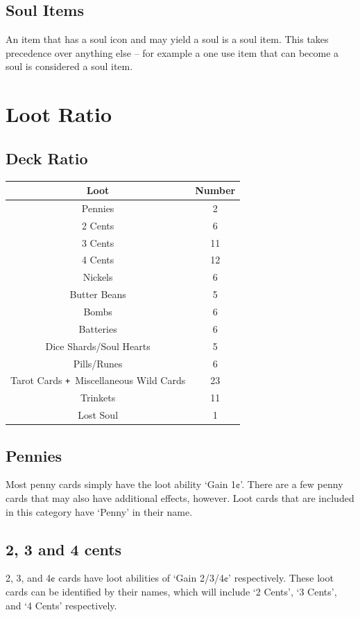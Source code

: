 \documentclass[a4paper, twoside]{report} %
\def\plus{\texttt{+}}
\begin{document}
    \subsection*{Soul Items}
    An item that has a soul icon and may yield a soul is a soul item. This takes precedence over anything else – for example a one use item that can become a soul is considered a soul item.

    \section{Loot Ratio}
    \subsection*{Deck Ratio}
    \begin{tabular}{ | c | c | }
        \hline
        \textbf{Loot} & \textbf{Number}\\
        \hline 
        Pennies & 2\\
        2 Cents & 6\\
        3 Cents & 11\\
        4 Cents & 12\\
        Nickels & 6\\
        Butter Beans & 5\\
        Bombs & 6\\
        Batteries & 6\\
        Dice Shards/Soul Hearts & 5\\
        Pills/Runes & 6\\
        Tarot Cards \plus\ Miscellaneous Wild Cards & 23\\
        Trinkets & 11\\
        Lost Soul & 1\\
        \hline
    \end{tabular}
    \subsection*{Pennies}
    Most penny cards simply have the loot ability ‘Gain 1¢’. There are a few penny cards that may also have additional effects, however. Loot cards that are included in this category have ‘Penny’ in their name.
    \subsection*{2, 3 and 4 cents}
    2, 3, and 4¢ cards have loot abilities of ‘Gain 2/3/4¢’ respectively. These loot cards can be identified by their names, which will include ‘2 Cents’, ‘3 Cents’, and ‘4 Cents’ respectively.
\end{document}
